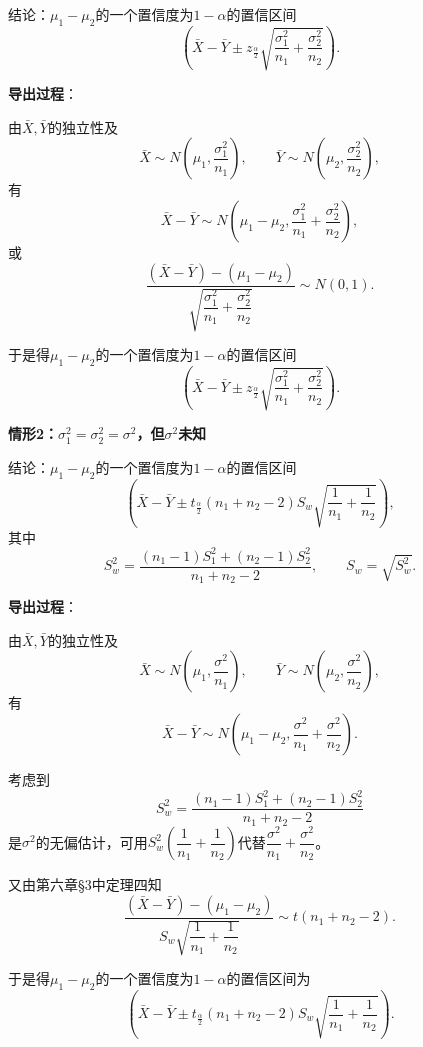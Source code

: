 \documentclass[11pt,a4paper]{report}
\theoremstyle{definition}
\begin{document}
结论：$\mu_{1}-\mu_{2}$的一个置信度为$1-\alpha$的置信区间
\[
\left(\bar{X}-\bar{Y}\pm z_{\frac{\alpha}{2}}\sqrt{\frac{\sigma_{1}^{2}}{n_{1}}+\frac{\sigma_{2}^{2}}{n_{2}}}\right).
\]

\textbf{导出过程}：

由$\bar{X},\bar{Y}$的独立性及
\[
\bar{X}\sim N\left(\mu_{1},\frac{\sigma_{1}^{2}}{n_{1}}\right),\qquad \bar{Y}\sim N\left(\mu_{2},\frac{\sigma_{2}^{2}}{n_{2}}\right),
\]
有
\[
\bar{X}-\bar{Y}\sim N\left(\mu_{1}-\mu_{2},\frac{\sigma_{1}^{2}}{n_{1}}+\frac{\sigma_{2}^{2}}{n_{2}}\right),
\]
或
\[
\frac{(\bar{X}-\bar{Y})-(\mu_{1}-\mu_{2})}{\sqrt{\dfrac{\sigma_{1}^{2}}{n_{1}}+\dfrac{\sigma_{2}^{2}}{n_{2}}}}\sim N(0,1).
\]

于是得$\mu_{1}-\mu_{2}$的一个置信度为$1-\alpha$的置信区间
\[
\left(\bar{X}-\bar{Y}\pm z_{\frac{\alpha}{2}}\sqrt{\frac{\sigma_{1}^{2}}{n_{1}}+\frac{\sigma_{2}^{2}}{n_{2}}}\right).
\]

\textbf{情形2：$\sigma_{1}^{2}=\sigma_{2}^{2}=\sigma^{2}$，但$\sigma^{2}$未知}

结论：$\mu_{1}-\mu_{2}$的一个置信度为$1-\alpha$的置信区间
\[
\left(\bar{X}-\bar{Y}\pm t_{\frac{\alpha}{2}}(n_{1}+n_{2}-2)S_{w}\sqrt{\frac{1}{n_{1}}+\frac{1}{n_{2}}}\right),
\]
其中
\[
S_{w}^{2}=\frac{(n_{1}-1)S_{1}^{2}+(n_{2}-1)S_{2}^{2}}{n_{1}+n_{2}-2},\qquad S_{w}=\sqrt{S_{w}^{2}}.
\]

\textbf{导出过程}：

由$\bar{X},\bar{Y}$的独立性及
\[
\bar{X}\sim N\left(\mu_{1},\frac{\sigma^{2}}{n_{1}}\right),\qquad \bar{Y}\sim N\left(\mu_{2},\frac{\sigma^{2}}{n_{2}}\right),
\]
有
\[
\bar{X}-\bar{Y}\sim N\left(\mu_{1}-\mu_{2},\frac{\sigma^{2}}{n_{1}}+\frac{\sigma^{2}}{n_{2}}\right).
\]

考虑到
\[
S_{w}^{2}=\frac{(n_{1}-1)S_{1}^{2}+(n_{2}-1)S_{2}^{2}}{n_{1}+n_{2}-2}
\]
是$\sigma^{2}$的无偏估计，可用$S_{w}^{2}\left(\dfrac{1}{n_{1}}+\dfrac{1}{n_{2}}\right)$代替$\dfrac{\sigma^{2}}{n_{1}}+\dfrac{\sigma^{2}}{n_{2}}$。

又由第六章\S3中定理四知
\[
\frac{(\bar{X}-\bar{Y})-(\mu_{1}-\mu_{2})}{S_{w}\sqrt{\dfrac{1}{n_{1}}+\dfrac{1}{n_{2}}}}\sim t(n_{1}+n_{2}-2).
\]

于是得$\mu_{1}-\mu_{2}$的一个置信度为$1-\alpha$的置信区间为
\[
\left(\bar{X}-\bar{Y}\pm t_{\frac{\alpha}{2}}(n_{1}+n_{2}-2)S_{w}\sqrt{\frac{1}{n_{1}}+\frac{1}{n_{2}}}\right).
\]
\end{document}
